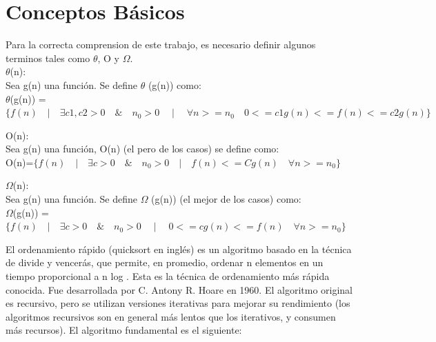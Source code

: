 \documentclass[spanish]{article}
\begin{document}
\newpage

	\section{Conceptos B\'asicos}
	Para la correcta comprension de este trabajo, es necesario definir algunos terminos tales como $\theta$, O y $\Omega$.\\
	 $\theta$(n):\\
		Sea g(n) una función. Se define  $\theta$ (g(n)) como:\\
		
		 	$\theta$(g(n)) = $\{ f(n) \quad | \quad \exists c1,c2>0 \quad \& \quad n_{0}>0 \quad \mid \quad \forall n>=n_{0} \quad 0<= c1g(n) <= f(n) <= c2g(n) \}$
	\bigskip		 	
		 	
	O(n):\\
		Sea  g(n)  una función, O(n) (el pero de los casos) se define como:\\
		
			\hspace{1cm}O(n)=$\{f(n) \quad | \quad \exists c >0 \quad \& \quad n_{0}>0 \quad | \quad f(n) <= Cg(n) \quad \forall  n>= n_{0} \}$
	\bigskip
	
	$\Omega$(n):\\
	Sea  g(n)  una función. Se define $\Omega$ (g(n)) (el mejor de los casos) como:\\

		\hspace{1cm}$\Omega$(g(n)) =$\{f(n) \quad | \quad \exists c >0 \quad \& \quad n_{0}>0 \quad \mid \quad  0<= cg(n)<= f(n) \quad \forall n>= n_{0} \}$
	\bigskip

	El ordenamiento rápido (quicksort en inglés) es un algoritmo basado en la técnica de divide y vencerás, que permite, en promedio, ordenar n elementos en un tiempo proporcional a n log  		. Esta es la técnica de ordenamiento más rápida conocida. Fue desarrollada por C. Antony R. Hoare en 1960. El algoritmo original es recursivo, pero se utilizan versiones iterativas para 		mejorar su rendimiento (los algoritmos recursivos son en general más lentos que los iterativos, y consumen más recursos).
	El algoritmo fundamental es el siguiente:
\end{document}
